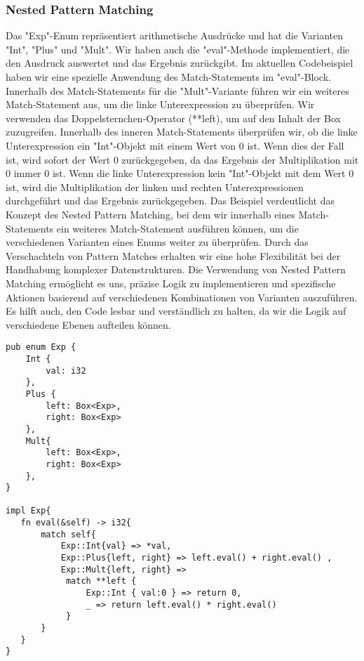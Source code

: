 \documentclass[a4paper, 1ppt]{article}
\begin{document}
\subsubsection{Nested Pattern Matching}
Das "Exp"-Enum repräsentiert arithmetische Ausdrücke und hat die Varianten "Int", "Plus" und "Mult". Wir haben auch die "eval"-Methode implementiert, die den Ausdruck auswertet und das Ergebnis zurückgibt.
Im aktuellen Codebeispiel haben wir eine spezielle Anwendung des Match-Statements im "eval"-Block. Innerhalb des Match-Statements für die "Mult"-Variante führen wir ein weiteres Match-Statement aus, um die linke Unterexpression zu überprüfen. Wir verwenden das Doppelsternchen-Operator (**left), um auf den Inhalt der Box zuzugreifen.
Innerhalb des inneren Match-Statements überprüfen wir, ob die linke Unterexpression ein "Int"-Objekt mit einem Wert von 0 ist. Wenn dies der Fall ist, wird sofort der Wert 0 zurückgegeben, da das Ergebnis der Multiplikation mit 0 immer 0 ist.
Wenn die linke Unterexpression kein "Int"-Objekt mit dem Wert 0 ist, wird die Multiplikation der linken und rechten Unterexpressionen durchgeführt und das Ergebnis zurückgegeben.
Das Beispiel verdeutlicht das Konzept des Nested Pattern Matching, bei dem wir innerhalb eines Match-Statements ein weiteres Match-Statement ausführen können, um die verschiedenen Varianten eines Enums weiter zu überprüfen. Durch das Verschachteln von Pattern Matches erhalten wir eine hohe Flexibilität bei der Handhabung komplexer Datenstrukturen.
Die Verwendung von Nested Pattern Matching ermöglicht es uns, präzise Logik zu implementieren und spezifische Aktionen basierend auf verschiedenen Kombinationen von Varianten auszuführen. Es hilft auch, den Code lesbar und verständlich zu halten, da wir die Logik auf verschiedene Ebenen aufteilen können.
\begin{verbatim}
pub enum Exp {
    Int {
        val: i32
    },
    Plus {
        left: Box<Exp>,
        right: Box<Exp>
    },
    Mult{
        left: Box<Exp>,
        right: Box<Exp>
    },
}

impl Exp{
   fn eval(&self) -> i32{
       match self{
           Exp::Int{val} => *val,
           Exp::Plus{left, right} => left.eval() + right.eval() ,
           Exp::Mult{left, right} => 
            match **left {
                Exp::Int { val:0 } => return 0,
                _ => return left.eval() * right.eval()
            }
       }
   }
}
\end{verbatim}
\end{document}
